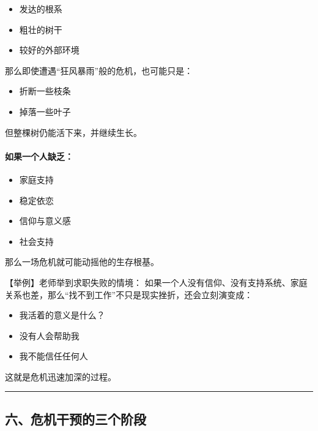 \documentclass[
  chinese,
  9pt,
  a4paper,
]{ctexart}
\providecommand{\tightlist}{%
  \setlength{\itemsep}{0pt}\setlength{\parskip}{0pt}}
\begin{document}
\begin{itemize}
\tightlist
\item
  发达的根系
\item
  粗壮的树干
\item
  较好的外部环境
\end{itemize}

那么即使遭遇``狂风暴雨''般的危机，也可能只是：

\begin{itemize}
\tightlist
\item
  折断一些枝条
\item
  掉落一些叶子
\end{itemize}

但整棵树仍能活下来，并继续生长。

\paragraph{如果一个人缺乏：}\label{ux5982ux679cux4e00ux4e2aux4ebaux7f3aux4e4f}

\begin{itemize}
\tightlist
\item
  家庭支持
\item
  稳定依恋
\item
  信仰与意义感
\item
  社会支持
\end{itemize}

那么一场危机就可能动摇他的生存根基。

【举例】老师举到求职失败的情境：
如果一个人没有信仰、没有支持系统、家庭关系也差，那么``找不到工作''不只是现实挫折，还会立刻演变成：

\begin{itemize}
\tightlist
\item
  我活着的意义是什么？
\item
  没有人会帮助我
\item
  我不能信任任何人
\end{itemize}

这就是危机迅速加深的过程。

\begin{center}\rule{0.5\linewidth}{0.5pt}\end{center}

\subsection{六、危机干预的三个阶段}\label{ux516dux5371ux673aux5e72ux9884ux7684ux4e09ux4e2aux9636ux6bb5}
\end{document}
